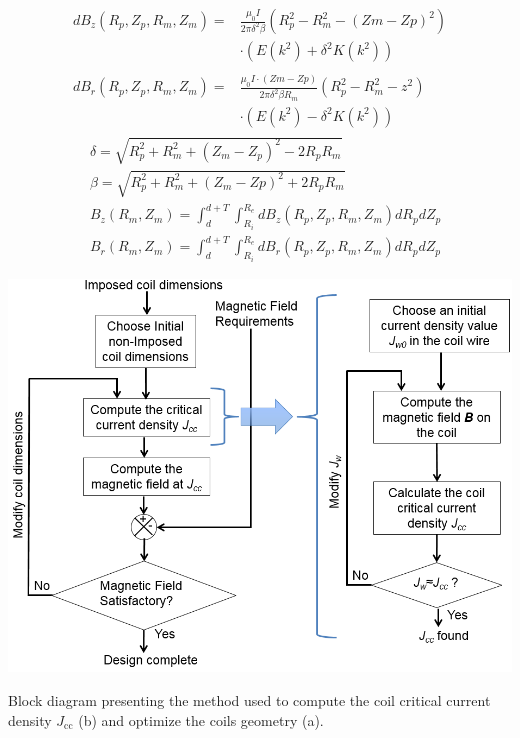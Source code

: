 \documentclass{ws-jmrr}
\begin{document}
\begin{multicols}{2}
\begin{align}
\begin{split}
dB_z(R_p,Z_p,R_m,Z_m) =&\frac{\mu _0I}{2\pi\delta ^{2}\beta  } \left( R_p^2-R_m ^2- \left(Zm-Zp\right)^2 \right)\\
& \cdot \left(E\left(k^2\right)+\delta ^2K\left(k^2\right)\right)  \label{Bz1loop}
\end{split}\\
\begin{split}
dB_r(R_p,Z_p,R_m,Z_m) =&\frac{\mu _0 I \cdot (Zm-Zp)}{2\pi\delta ^{2}\beta R_m   } \left( R_p^2-R_m ^2-z^2 \right)\\
&  \cdot  \left(E(k^2)-\delta ^2K(k^2)\right) \label{Br1loop}
\end{split}
\end{align}
\begin{align}
&\delta =\sqrt{R_p^2+R_m^2+(Z_m-Z_p)^2-2R_pR_m} \label{delta}\\
&\beta =\sqrt{R_p^2+R_m^2+(Z_m-Zp)^2+2R_pR_m} \label{beta}\\
&B_z(R_m,Z_m)=\!\!\int_{d}^{d+T}\!\!\!\!\int_{R_i}^{R_e}\!\!\!dB_z(R_p,Z_p,R_m,Z_m)dR_pdZ_p  \label{Bztot}\\
&B_r(R_m,Z_m)=\!\!\int_{d}^{d+T}\!\!\!\!\int_{R_i}^{R_e}\!\!\!dB_r(R_p,Z_p,R_m,Z_m)dR_pdZ_p \label{Brtot}
\end{align}
\begin{figurehere}
\begin{center}
	\includegraphics[width=\linewidth]{method.png}
	\caption{Block diagram presenting the method used to compute the coil critical current density $J_{\textrm{cc}}$ (b) and optimize the coils geometry (a).}
	\label{method}
	\end{center}
\end{figurehere}

\end{multicols}
\end{document}
